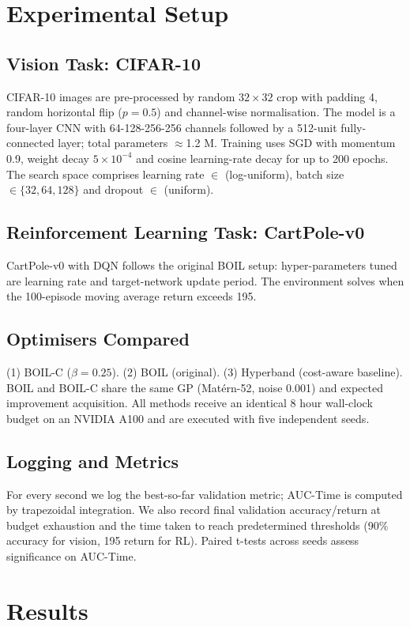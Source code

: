 \documentclass{article} %
\begin{document}
\section{Experimental Setup}
\label{sec:experimental}
\subsection{Vision Task: CIFAR-10}
CIFAR-10 images are pre-processed by random \(32\times 32\) crop with padding 4, random horizontal flip (\(p=0.5\)) and channel-wise normalisation. The model is a four-layer CNN with 64-128-256-256 channels followed by a 512-unit fully-connected layer; total parameters \(\approx\)1.2 M. Training uses SGD with momentum 0.9, weight decay \(5\times 10^{-4}\) and cosine learning-rate decay for up to 200 epochs. The search space comprises learning rate \(\in\) (log-uniform), batch size \(\in\{32,64,128\}\) and dropout \(\in\) (uniform).

\subsection{Reinforcement Learning Task: CartPole-v0}
CartPole-v0 with DQN follows the original BOIL setup: hyper-parameters tuned are learning rate and target-network update period. The environment solves when the 100-episode moving average return exceeds 195.

\subsection{Optimisers Compared}
(1) BOIL-C (\(\beta=0.25\)). (2) BOIL (original). (3) Hyperband (cost-aware baseline). BOIL and BOIL-C share the same GP (Mat\'ern-52, noise 0.001) and expected improvement acquisition. All methods receive an identical 8 hour wall-clock budget on an NVIDIA A100 and are executed with five independent seeds.

\subsection{Logging and Metrics}
For every second we log the best-so-far validation metric; AUC-Time is computed by trapezoidal integration. We also record final validation accuracy/return at budget exhaustion and the time taken to reach predetermined thresholds (90\% accuracy for vision, 195 return for RL). Paired t-tests across seeds assess significance on AUC-Time.

\section{Results}
\label{sec:results}
\end{document}
